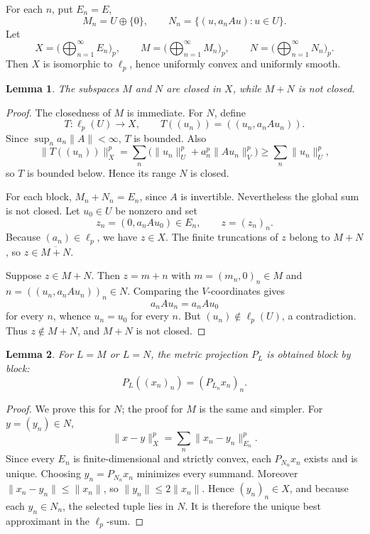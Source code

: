 \documentclass[11pt]{article}
\newtheorem{lemma}{Lemma}
\begin{document}
For each \(n\), put \(E_n=E\),
\[
  M_n=U\oplus\{0\}, \qquad
  N_n=\{(u,a_nAu):u\in U\}.
\]
Let
\[
  X=\Big(\bigoplus_{n=1}^\infty E_n\Big)_p,\qquad
  M=\Big(\bigoplus_{n=1}^\infty M_n\Big)_p,\qquad
  N=\Big(\bigoplus_{n=1}^\infty N_n\Big)_p.
\]
Then \(X\) is isomorphic to \(\ell_p\), hence uniformly convex and uniformly smooth.

\begin{lemma}
The subspaces \(M\) and \(N\) are closed in \(X\), while \(M+N\) is not closed.
\end{lemma}

\begin{proof}
The closedness of \(M\) is immediate.  For \(N\), define
\[
  T:\ell_p(U)\to X,\qquad T((u_n))=((u_n,a_nAu_n)).
\]
Since \(\sup_n a_n\|A\|<\infty\), \(T\) is bounded.  Also
\[
  \|T((u_n))\|_X^p
  =\sum_n \big(\|u_n\|_U^p+a_n^p\|Au_n\|_V^p\big)
  \geq \sum_n \|u_n\|_U^p,
\]
so \(T\) is bounded below.  Hence its range \(N\) is closed.

For each block, \(M_n+N_n=E_n\), since \(A\) is invertible.  Nevertheless the global sum is not closed.  Let \(u_0\in U\) be nonzero and set
\[
  z_n=(0,a_nAu_0)\in E_n,\qquad z=(z_n)_n.
\]
Because \((a_n)\in\ell_p\), we have \(z\in X\).  The finite truncations of \(z\) belong to \(M+N\), so \(z\in\overline{M+N}\).

Suppose \(z\in M+N\).  Then \(z=m+n\) with \(m=(m_n,0)_n\in M\) and \(n=((u_n,a_nAu_n))_n\in N\).  Comparing the \(V\)-coordinates gives
\[
  a_n A u_n = a_n A u_0
\]
for every \(n\), whence \(u_n=u_0\) for every \(n\).  But \((u_n)\notin\ell_p(U)\), a contradiction.  Thus \(z\notin M+N\), and \(M+N\) is not closed.
\end{proof}

\begin{lemma}
For \(L=M\) or \(L=N\), the metric projection \(P_L\) is obtained block by block:
\[
  P_L((x_n)_n)=(P_{L_n}x_n)_n.
\]
\end{lemma}

\begin{proof}
We prove this for \(N\); the proof for \(M\) is the same and simpler.  For \(y=(y_n)\in N\),
\[
  \|x-y\|_X^p=\sum_n \|x_n-y_n\|_{E_n}^p.
\]
Since every \(E_n\) is finite-dimensional and strictly convex, each \(P_{N_n}x_n\) exists and is unique.  Choosing \(y_n=P_{N_n}x_n\) minimizes every summand.  Moreover \(\|x_n-y_n\|\leq \|x_n\|\), so \(\|y_n\|\leq2\|x_n\|\).  Hence \((y_n)_n\in X\), and because each \(y_n\in N_n\), the selected tuple lies in \(N\).  It is therefore the unique best approximant in the \(\ell_p\)-sum.
\end{proof}
\end{document}
